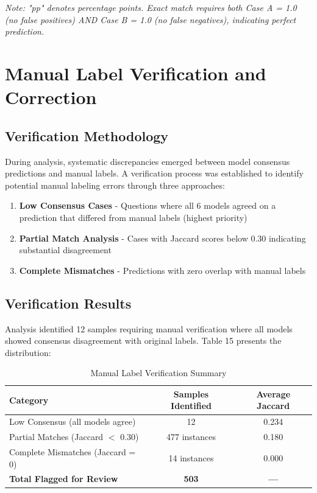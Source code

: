 \documentclass[12pt,a4paper]{article}
\begin{document}
\textit{Note: "pp" denotes percentage points. Exact match requires both Case A = 1.0 (no false positives) AND Case B = 1.0 (no false negatives), indicating perfect prediction.}

\newpage

\section{Manual Label Verification and Correction}

\subsection{Verification Methodology}

During analysis, systematic discrepancies emerged between model consensus predictions and manual labels. A verification process was established to identify potential manual labeling errors through three approaches:

\begin{enumerate}[leftmargin=*]
    \item \textbf{Low Consensus Cases} - Questions where all 6 models agreed on a prediction that differed from manual labels (highest priority)
    
    \item \textbf{Partial Match Analysis} - Cases with Jaccard scores below 0.30 indicating substantial disagreement
    
    \item \textbf{Complete Mismatches} - Predictions with zero overlap with manual labels
\end{enumerate}

\subsection{Verification Results}

Analysis identified 12 samples requiring manual verification where all models showed consensus disagreement with original labels. Table 15 presents the distribution:

\begin{table}[H]
\centering
\label{tab:verification_summary}
\begin{tabular}{lcc}
\toprule
\textbf{Category} & \textbf{Samples Identified} & \textbf{Average Jaccard} \\
\midrule
Low Consensus (all models agree) & 12 & 0.234 \\
Partial Matches (Jaccard $<$ 0.30) & 477 instances & 0.180 \\
Complete Mismatches (Jaccard = 0) & 14 instances & 0.000 \\
\midrule
\textbf{Total Flagged for Review} & \textbf{503} & \textbf{---} \\
\bottomrule
\end{tabular}
\caption{Manual Label Verification Summary}
\end{table}
\end{document}
